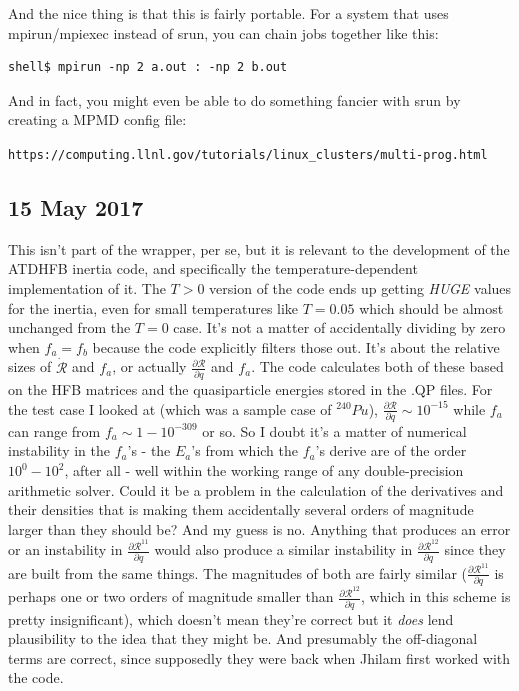 \documentclass[]{report}
\begin{document}
And the nice thing is that this is fairly portable. For a system that uses mpirun/mpiexec instead of srun, you can chain jobs together like this:

\begin{verbatim}
shell$ mpirun -np 2 a.out : -np 2 b.out
\end{verbatim}

And in fact, you might even be able to do something fancier with srun by creating a MPMD config file:

\noindent\verb|https://computing.llnl.gov/tutorials/linux_clusters/multi-prog.html|

\subsection*{15 May 2017}

This isn't part of the wrapper, per se, but it is relevant to the development of the ATDHFB inertia code, and specifically the temperature-dependent implementation of it. The $T>0$ version of the code ends up getting \textit{HUGE} values for the inertia, even for small temperatures like $T=0.05$ which should be almost unchanged from the $T=0$ case. It's not a matter of accidentally dividing by zero when $f_a=f_b$ because the code explicitly filters those out. It's about the relative sizes of $\dot{\mathcal{R}}$ and $f_a$, or actually $\frac{\partial \mathcal{R}}{\partial q}$ and $f_a$. The code calculates both of these based on the HFB matrices and the quasiparticle energies stored in the .QP files. For the test case I looked at (which was a sample case of $^{240}Pu$), $\frac{\partial \mathcal{R}}{\partial q}\sim 10^{-15}$ while $f_a$ can range from $f_a \sim 1-10^{-309}$ or so. So I doubt it's a matter of numerical instability in the $f_a$'s - the $E_a$'s from which the $f_a$'s derive are of the order $10^0-10^2$, after all - well within the working range of any double-precision arithmetic solver. Could it be a problem in the calculation of the derivatives and their densities that is making them accidentally several orders of magnitude larger than they should be? And my guess is no. Anything that produces an error or an instability in $\frac{\partial \mathcal{R}^{11}}{\partial q}$ would also produce a similar instability in $\frac{\partial \mathcal{R}^{12}}{\partial q}$ since they are built from the same things. The magnitudes of both are fairly similar ($\frac{\partial \mathcal{R}^{11}}{\partial q}$ is perhaps one or two orders of magnitude smaller than $\frac{\partial \mathcal{R}^{12}}{\partial q}$, which in this scheme is pretty insignificant), which doesn't mean they're correct but it \textit{does} lend plausibility to the idea that they might be. And presumably the off-diagonal terms are correct, since supposedly they were back when Jhilam first worked with the code.
\end{document}
